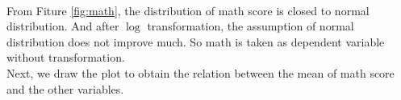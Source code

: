 \documentclass{article}
\begin{document}
\begin{minipage}{\linewidth}
    \label{fig:math}
\end{minipage}\\

From Fiture \ref{fig:math}, the distribution of math score is closed to normal distribution. And after $\log$ transformation, 
the assumption of normal distribution does not improve much. So math is taken as dependent variable without transformation.\\

Next, we draw the plot to obtain the relation between the mean of math score and the other variables.\\

\begin{minipage}{\linewidth}
    \label{fig:variable}
\end{minipage}\\
\end{document}
